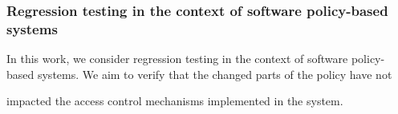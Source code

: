 \subsubsection{Regression testing in the context of software policy-based systems}

In this work, we consider regression testing in the context of software policy-based systems. We aim to verify that the changed parts of the policy have not 

impacted the access control mechanisms implemented in the system.







